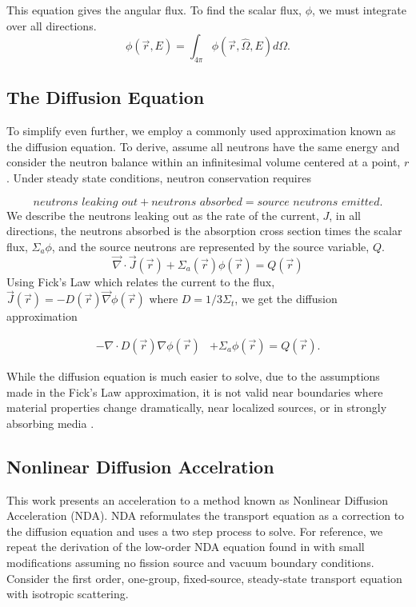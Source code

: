 This equation gives the angular flux. To find the scalar flux, $\phi$, we must integrate over all directions.
\begin{equation}
    \phi(\vec{r}, E) = \int_{4\pi} \phi(\vec{r}, \hat{\Omega}, E) d \Omega.
\end{equation}

\subsection{The Diffusion Equation}
To simplify even further, we employ a commonly used approximation known as the diffusion equation. To derive, assume all neutrons have the same energy and consider the neutron balance within an infinitesimal volume centered at a point, $r$. Under steady state conditions, neutron conservation requires

\begin{equation}
    \textit{neutrons leaking out} + \textit{neutrons absorbed} = \textit{source neutrons emitted}.
\end{equation}
We describe the neutrons leaking out as the rate of the current, $J$, in all directions, the neutrons absorbed is the absorption cross section times the scalar flux, $\Sigma_a\phi$, and the source neutrons are represented by the source variable, $Q$. 
\begin{equation}
    \vec{\nabla}\cdot \vec{J}(\vec{r}) + \Sigma_a(\vec{r})\phi(\vec{r}) = Q(\vec{r})
\end{equation}
Using Fick's Law which relates the current to the flux, $\vec{J}(\vec{r}) = -D(\vec{r})\vec{\nabla}\phi(\vec{r})$ where $D = 1/3\Sigma_t$, we get the diffusion approximation

\begin{equation}
\begin{split}
 - \nabla \cdot D(\vec{r})\nabla\phi(\vec{r}) &+ \Sigma_a \phi(\vec{r}) = Q(\vec{r}).
\end{split}
\label{eq:diffusion_fixed_source}
\end{equation}

While the diffusion equation is much easier to solve, due to the assumptions made in the Fick's Law approximation, it is not valid near boundaries where material properties change dramatically, near localized sources, or in strongly absorbing media \cite{lewis-miller}.

\subsection{Nonlinear Diffusion Accelration}
This work presents an acceleration to a method known as Nonlinear Diffusion Acceleration (NDA). NDA reformulates the transport equation as a correction to the diffusion equation and uses a two step process to solve. For reference, we repeat the derivation of the low-order NDA equation found in \cite{morel-holo} with small modifications assuming no fission source and vacuum boundary conditions. Consider the first order, one-group, fixed-source, steady-state \sn transport equation with isotropic scattering. 

